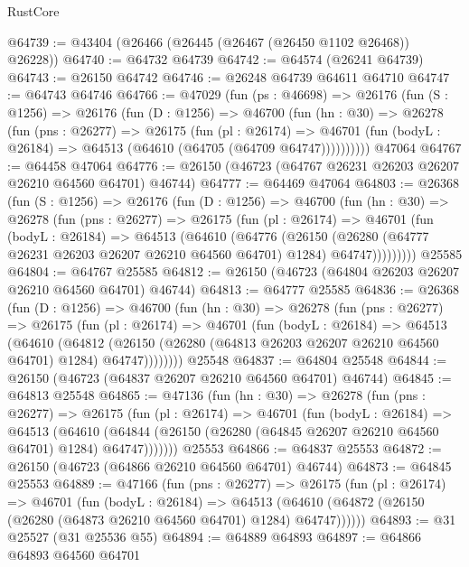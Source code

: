 \begin{lexlean}{RustCore}
\begin{coremodule}
@64739 := @43404 (@26466 (@26445 (@26467 (@26450 @1102 @26468)) @26228))
@64740 := @64732 @64739
@64742 := @64574 (@26241 @64739)
@64743 := @26150 @64742
@64746 := @26248 @64739 @64611 @64710
@64747 := @64743 @64746
@64766 := @47029
    (fun (ps : @46698) =>
    @26176
      (fun (S : @1256) =>
      @26176
        (fun (D : @1256) =>
        @46700
          (fun (hn : @30) =>
          @26278
            (fun (pns : @26277) =>
            @26175
              (fun (pl : @26174) =>
              @46701 (fun (bodyL : @26184) => @64513 (@64610 (@64705 (@64709 @64747))))))))))
    @47064
@64767 := @64458 @47064
@64776 := @26150 (@46723 (@64767 @26231 @26203 @26207 @26210 @64560 @64701) @46744)
@64777 := @64469 @47064
@64803 := @26368
    (fun (S : @1256) =>
    @26176
      (fun (D : @1256) =>
      @46700
        (fun (hn : @30) =>
        @26278
          (fun (pns : @26277) =>
          @26175
            (fun (pl : @26174) =>
            @46701
              (fun (bodyL : @26184) =>
              @64513
                (@64610
                  (@64776
                    (@26150
                      (@26280 (@64777 @26231 @26203 @26207 @26210 @64560 @64701) @1284)
                      @64747)))))))))
    @25585
@64804 := @64767 @25585
@64812 := @26150 (@46723 (@64804 @26203 @26207 @26210 @64560 @64701) @46744)
@64813 := @64777 @25585
@64836 := @26368
    (fun (D : @1256) =>
    @46700
      (fun (hn : @30) =>
      @26278
        (fun (pns : @26277) =>
        @26175
          (fun (pl : @26174) =>
          @46701
            (fun (bodyL : @26184) =>
            @64513
              (@64610
                (@64812
                  (@26150 (@26280 (@64813 @26203 @26207 @26210 @64560 @64701) @1284) @64747))))))))
    @25548
@64837 := @64804 @25548
@64844 := @26150 (@46723 (@64837 @26207 @26210 @64560 @64701) @46744)
@64845 := @64813 @25548
@64865 := @47136
    (fun (hn : @30) =>
    @26278
      (fun (pns : @26277) =>
      @26175
        (fun (pl : @26174) =>
        @46701
          (fun (bodyL : @26184) =>
          @64513
            (@64610
              (@64844 (@26150 (@26280 (@64845 @26207 @26210 @64560 @64701) @1284) @64747)))))))
    @25553
@64866 := @64837 @25553
@64872 := @26150 (@46723 (@64866 @26210 @64560 @64701) @46744)
@64873 := @64845 @25553
@64889 := @47166
    (fun (pns : @26277) =>
    @26175
      (fun (pl : @26174) =>
      @46701
        (fun (bodyL : @26184) =>
        @64513 (@64610 (@64872 (@26150 (@26280 (@64873 @26210 @64560 @64701) @1284) @64747))))))
@64893 := @31 @25527 (@31 @25536 @55)
@64894 := @64889 @64893
@64897 := @64866 @64893 @64560 @64701

\end{coremodule}
\end{lexlean}

